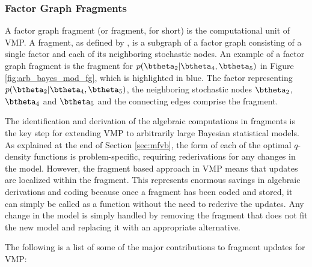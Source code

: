 \documentclass[12pt]{article}
\theoremstyle{plain}
\theoremstyle{definition}
\theoremstyle{remark}
\begin{document}

\subsubsection{Factor Graph Fragments}
\label{sec:fg_frag}

A factor graph fragment (or fragment, for short) is the computational unit of VMP.
A fragment, as defined by ,
is a subgraph of a factor graph
consisting of a single factor and each of its neighboring stochastic nodes.
An example of a factor graph fragment is the fragment for $p (\btheta_2 | \btheta_4, \btheta_5)$ in Figure
\ref{fig:arb_bayes_mod_fg}, which is highlighted in blue. The factor representing $p (\btheta_2 | \btheta_4, \btheta_5)$,
the neighboring stochastic nodes $\btheta_2$, $\btheta_4$ and $\btheta_5$
and the connecting edges comprise the fragment.

The identification and derivation of the algebraic computations in fragments is the key step for extending VMP
to arbitrarily large Bayesian statistical models. As explained at the end of Section \ref{sec:mfvb}, the form of each of the
optimal $q$-density functions is problem-specific, requiring rederivations for any changes in the model. However,
the fragment based approach in VMP means that updates are localized within the fragment.
This represents enormous savings in algebraic derivations and coding because once a fragment has
been coded and stored, it can simply be called as a function without the need to rederive the updates.
Any change in the model is simply handled by removing the fragment that does not fit the new model and replacing
it with an appropriate alternative.

The following is a list of some of the major contributions to fragment updates for VMP:
\end{document}

